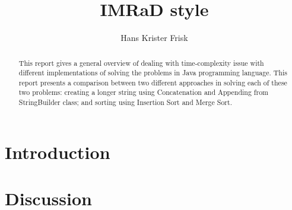 \documentclass[11pt,a4paper]{article}
\begin{document}
\title{IMRaD style}
\author{Hans Krister Frisk}
\maketitle

\begin{abstract}
	This report gives a general overview of dealing with time-complexity issue with different implementations of solving the problems in Java programming language. This report presents a comparison between two different approaches in solving each of these two problems: creating a longer string using Concatenation and Appending from StringBuilder class; and sorting using Insertion Sort and Merge Sort.
\end{abstract}

\tableofcontents

\section{Introduction}


\section{Discussion}

\begin{thebibliography}{99}

\end{thebibliography}
\end{document}
